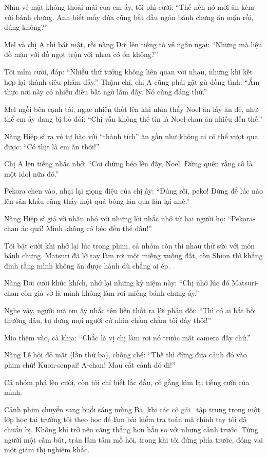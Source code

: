 \documentclass[../main.tex]{subfiles}
\begin{document}
Nhìn vẻ mặt không thoải mái của em ấy, tôi phì cười: ``Thế nên nó mới ăn kèm với bánh chưng. Anh biết mấy đứa cũng bắt đầu ngán bánh chưng ăn mặn rồi, đúng không?''

Mel và chị A thì bát mật, rồi nàng Dơi lên tiếng tỏ vẻ ngần ngại: ``Nhưng mà liệu đồ mặn với đồ ngọt trộn với nhau có ổn không?''

Tôi mỉm cười, đáp: ``Nhiều thứ tưởng không liên quan với nhau, nhưng khi kết hợp lại thành siêu phẩm đấy.'' Thậm chí, chị A cũng phải gật gù đồng tình: ``Ẩm thực nơi này có nhiều điều bất ngờ lắm đấy. Nó cũng đáng thử.''

\il

Mel ngồi bên cạnh tôi, ngạc nhiên thốt lên khi nhìn thấy Noel ăn lấy ăn để, như thể em ấy đang bị bỏ đói: ``Chị vẫn không thể tin là Noel-chan ăn nhiều đến thế.''

Nàng Hiệp sĩ ra vẻ tự hào với ``thành tích'' ăn gần như không ai có thể vượt qua được: ``Có thịt là em ăn thôi!''

Chị A lên tiếng nhắc nhở: ``Coi chừng béo lên đấy, Noel. Đừng quên rằng cô là một idol nữa đó.''

Pekora chen vào, nhại lại giọng điệu của chị ấy: ``Đúng rồi, peko! Đừng để lúc nào lên sân khấu cũng thấy một quả bóng lăn qua lăn lại nhé.''

Nàng Hiệp sĩ giả vờ nhăn nhó với những lời nhắc nhở từ hai người họ: ``Pekora-chan ác quá! Mình không có béo đến thế đâu!''

Tôi bật cười khi nhớ lại lúc trong phim, cả nhóm còn thi nhau thử sức với món bánh chưng. Matsuri đã lỡ tay làm rơi một miếng xuống đất, còn Shion thì khẳng định rằng mình không ăn được hành dù chẳng ai ép.

Nàng Dơi cười khúc khích, nhớ lại những kỷ niệm này: ``Chị nhớ lúc đó Matsuri-chan còn giả vờ là mình không làm rơi miếng bánh chưng ấy.''

Nghe vậy, người mà em ấy nhắc tên liền thốt ra lời phản đối: ``Thì có ai bắt bồi thường đâu, tự dưng mọi người cứ nhìn chằm chằm tôi đấy thôi!''

Mio thêm vào, cà khịa: ``Chắc là vị chị làm rơi nó trước mặt camera đấy chứ.''

Nàng Lễ hội đỏ mặt (lần thứ ba), chống ché: ``Thế thì đừng đưa cảnh đó vào phim chứ! Kuon-senpai! A-chan! Mau cắt cảnh đó đi!''

Cả nhóm phá lên cười, còn tôi chỉ biết lắc đầu, cố gắng kìm lại tiếng cười của mình.

Cảnh phim chuyển sang buổi sáng mùng Ba, khi các cô gái \hll\ tập trung trong một lớp học tại trường tôi theo học để làm bài kiểm tra toán mà chính tay tôi đã chuẩn bị. Không khí trở nên căng thẳng hơn hẳn so với những cảnh trước. Từng người một cầm bút, trán lấm tấm mồ hôi, trong khi tôi đứng phía trước, đóng vai một giám thị nghiêm khắc.
\end{document}
